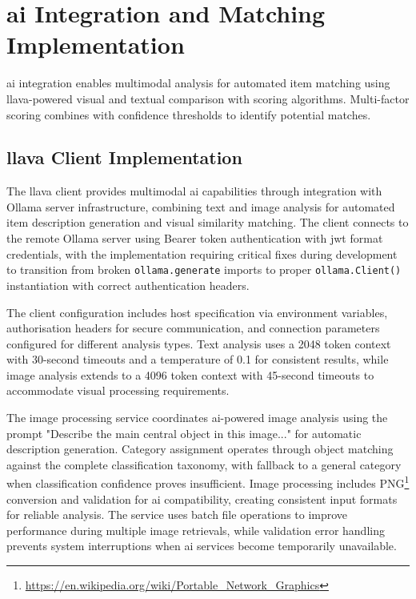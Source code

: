 
\section{\acs{ai} Integration and Matching Implementation} \label{section:ai_integration}

\ac{ai} integration enables multimodal analysis for automated item matching using \ac{llava}-powered visual and textual comparison with scoring algorithms. Multi-factor scoring combines with confidence thresholds to identify potential matches.

\subsection{\acs{llava} Client Implementation} \label{subsection:llava_client}

The \ac{llava} client provides multimodal \ac{ai} capabilities through integration with Ollama server infrastructure, combining text and image analysis for automated item description generation and visual similarity matching. The client connects to the remote Ollama server using Bearer token authentication with \ac{jwt} format credentials, with the implementation requiring critical fixes during development to transition from broken \texttt{ollama.generate} imports to proper \texttt{ollama.Client()} instantiation with correct authentication headers.


The client configuration includes host specification via environment variables, authorisation headers for secure communication, and connection parameters configured for different analysis types. Text analysis uses a 2048 token context with 30-second timeouts and a temperature of 0.1 for consistent results, while image analysis extends to a 4096 token context with 45-second timeouts to accommodate visual processing requirements.

The image processing service coordinates \ac{ai}-powered image analysis using the prompt "Describe the main central object in this image..." for automatic description generation. Category assignment operates through object matching against the complete classification taxonomy, with fallback to a general category when classification confidence proves insufficient. Image processing includes PNG\footnote{\url{https://en.wikipedia.org/wiki/Portable_Network_Graphics}} conversion and validation for \ac{ai} compatibility, creating consistent input formats for reliable analysis. The service uses batch file operations to improve performance during multiple image retrievals, while validation error handling prevents system interruptions when \ac{ai} services become temporarily unavailable.

